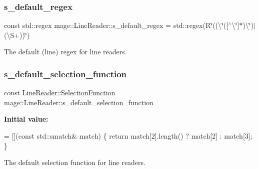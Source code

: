 \subsubsection{\texorpdfstring{s\+\_\+default\+\_\+regex}{s\_default\_regex}}
{\footnotesize\ttfamily const std\+::regex mage\+::\+Line\+Reader\+::s\+\_\+default\+\_\+regex = std\+::regex(R\char`\"{}((\textbackslash{}\char`\"{}(\mbox{[}$^\wedge$\textbackslash{}\char`\"{}\mbox{]}$\ast$)\textbackslash{}\char`\"{})$\vert$(\textbackslash{}S+))\char`\"{})\hspace{0.3cm}{\ttfamily [static]}}

The default (line) regex for line readers. \mbox{\label{classmage_1_1_line_reader_a93da10f6f69b44accfec8074712f35de}} 
\subsubsection{\texorpdfstring{s\+\_\+default\+\_\+selection\+\_\+function}{s\_default\_selection\_function}}
{\footnotesize\ttfamily const \mbox{\hyperlink{classmage_1_1_line_reader_a17bbae61a3ce30bdb251d6c76e1a4522}{Line\+Reader\+::\+Selection\+Function}} mage\+::\+Line\+Reader\+::s\+\_\+default\+\_\+selection\+\_\+function\hspace{0.3cm}{\ttfamily [static]}}

{\bfseries Initial value\+:}
\begin{DoxyCode}
= [](\textcolor{keyword}{const} std::smatch& match) \{ 
        \textcolor{keywordflow}{return} match[2].length() ? match[2] : match[3]; 
    \}
\end{DoxyCode}
The default selection function for line readers. 